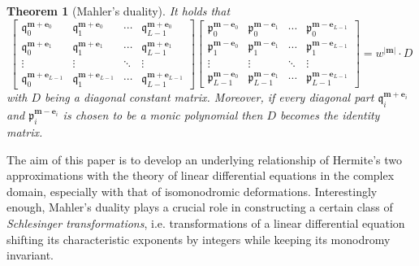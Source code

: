 \documentclass[12pt]{article}
\newtheorem{thm}{Theorem}[section]
\numberwithin{equation}{section}
\begin{document}
\begin{thm}[Mahler's duality]
\label{thm:original}
It holds that
\[
\begin{bmatrix}
{\mathfrak q}^{{\boldsymbol m}+{\boldsymbol e}_0 }_0 &{\mathfrak q}^{{\boldsymbol m}+{\boldsymbol e}_0 }_1 & \cdots&{\mathfrak q}^{{\boldsymbol m}+{\boldsymbol e}_0 }_{L-1} 
\\
{\mathfrak q}^{{\boldsymbol m}+{\boldsymbol e}_1 }_0 &{\mathfrak q}^{{\boldsymbol m}+{\boldsymbol e}_1 }_1 & \cdots&{\mathfrak q}^{{\boldsymbol m}+{\boldsymbol e}_1 }_{L-1} 
\\
\vdots & \vdots& \ddots & \vdots
\\
{\mathfrak q}^{{\boldsymbol m}+{\boldsymbol e}_{L-1} }_0 &{\mathfrak q}^{{\boldsymbol m}+{\boldsymbol e}_{L-1} }_1 & \cdots&{\mathfrak q}^{{\boldsymbol m}+{\boldsymbol e}_{L-1} }_{L-1} 
\end{bmatrix}
\begin{bmatrix}
{\mathfrak p}^{{\boldsymbol m}-{\boldsymbol e}_0 }_0 &{\mathfrak p}^{{\boldsymbol m}-{\boldsymbol e}_1 }_0 & \cdots&{\mathfrak p}^{{\boldsymbol m}-{\boldsymbol e}_{L-1} }_{0} 
\\
{\mathfrak p}^{{\boldsymbol m}-{\boldsymbol e}_0 }_1 &{\mathfrak p}^{{\boldsymbol m}-{\boldsymbol e}_1 }_1 & \cdots&{\mathfrak p}^{{\boldsymbol m}-{\boldsymbol e}_{L-1} }_{1} 
\\
\vdots & \vdots& \ddots & \vdots
\\
{\mathfrak p}^{{\boldsymbol m}-{\boldsymbol e}_{0} }_{L-1} &{\mathfrak p}^{{\boldsymbol m}-{\boldsymbol e}_{1} }_{L-1} & \cdots&{\mathfrak p}^{{\boldsymbol m}-{\boldsymbol e}_{L-1} }_{L-1} 
\end{bmatrix}
=w^{|{\boldsymbol m}|} \cdot D
\]
with $D$ being a diagonal constant matrix.
Moreover, if every diagonal part
${\mathfrak q}^{{\boldsymbol m}+{\boldsymbol e}_i }_i$
and 
${\mathfrak p}^{{\boldsymbol m}-{\boldsymbol e}_i }_i$
 is chosen to be a monic polynomial then $D$ becomes the identity matrix.
\end{thm}





The aim of this paper is to develop an underlying relationship of 
Hermite's two approximations
with
the theory of linear differential equations in the complex domain,
especially with that of isomonodromic deformations.
Interestingly enough, 
Mahler's duality plays a crucial role in constructing
a certain class of 
{\it Schlesinger transformations},
i.e.
transformations of a linear differential equation
shifting its characteristic exponents by integers while keeping its monodromy invariant.
\end{document}
